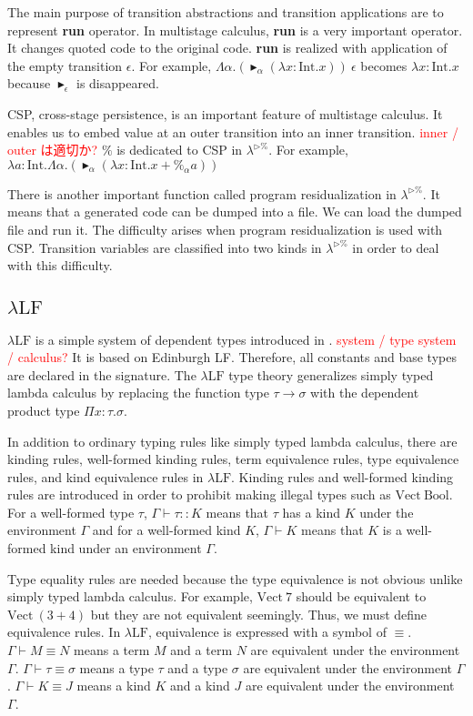 \documentclass[runningheads]{llncs}
\newcommand{\red}[1]{\textcolor{red}{#1 }}
\newcommand{\LTP}{$\lambda^{\triangleright\%}$\xspace}
\newcommand{\LLF}{$\lambda\textrm{LF}$\xspace}
\newcommand{\G}{\Gamma}
\newcommand{\TB}{\blacktriangleright}
\newcommand{\E}{\equiv}
\newcommand{\I}{\textrm{Int}}
\begin{document}
The main purpose of transition abstractions and transition applications are to represent {\bf{run}} operator.
In multistage calculus, {\bf{run}} is a very important operator.
It changes quoted code to the original code.
{\bf{run}} is realized with application of the empty transition $\epsilon$.
For example, $\Lambda\alpha.(\TB_\alpha (\lambda x:\I.x))\ \epsilon$ becomes $\lambda x:\I.x$
because $\TB_\epsilon$ is disappeared.

CSP, cross-stage persistence, is an important feature of multistage calculus.
It enables us to embed value at an outer transition into an inner transition.
\red{inner / outer は適切か?}
$\%$ is dedicated to CSP in \LTP.
For example, $\lambda a:\I.\Lambda\alpha.(\TB_\alpha (\lambda x:\I.x+\%_\alpha a))$


There is another important function called program residualization in \LTP.
It means that a generated code can be dumped into a file.
We can load the dumped file and run it.
The difficulty arises when program residualization is used with CSP.
Transition variables are classified into two kinds in \LTP in order to deal with this difficulty.

\subsection{\LLF}

\LLF is a simple system of dependent types introduced in \cite{attapl}.
\red{system / type system / calculus?}
It is based on Edinburgh LF\cite{harper1993framework}.
Therefore, all constants and base types are declared in the signature.
The \LLF type theory generalizes simply typed lambda calculus
by replacing the function type $\tau\to\sigma$ with the dependent product type $\Pi x:\tau.\sigma$.

In addition to ordinary typing rules like simply typed lambda calculus,
there are kinding rules, well-formed kinding rules, term equivalence rules, type equivalence rules, and kind equivalence rules in \LLF.
Kinding rules and well-formed kinding rules are 
introduced in order to prohibit making illegal types such as $\textrm{Vect}\ \textrm{Bool}$.
For a well-formed type $\tau$, $\G \vdash \tau :: K$ means that $\tau$ has a kind $K$ under the environment $\G$ and 
for a well-formed kind $K$, $\G \vdash K$ means that $K$ is a well-formed kind under an environment $\G$.

Type equality rules are needed because the type equivalence is not obvious unlike simply typed lambda calculus.
For example, $\textrm{Vect}\ 7$ should be equivalent to $\textrm{Vect}\ (3+4)$
but they are not equivalent seemingly. Thus, we must define equivalence rules.
In \LLF, equivalence is expressed with a symbol of $\E$.
$\G \vdash M \E N$ means a term $M$ and a term $N$ are equivalent under the environment $\G$.
$\G \vdash \tau \E \sigma$ means a type $\tau$ and a type $\sigma$ are equivalent under the environment $\G$.
$\G \vdash K \E J$ means a kind $K$ and a kind $J$ are equivalent under the environment $\G$.
\end{document}
